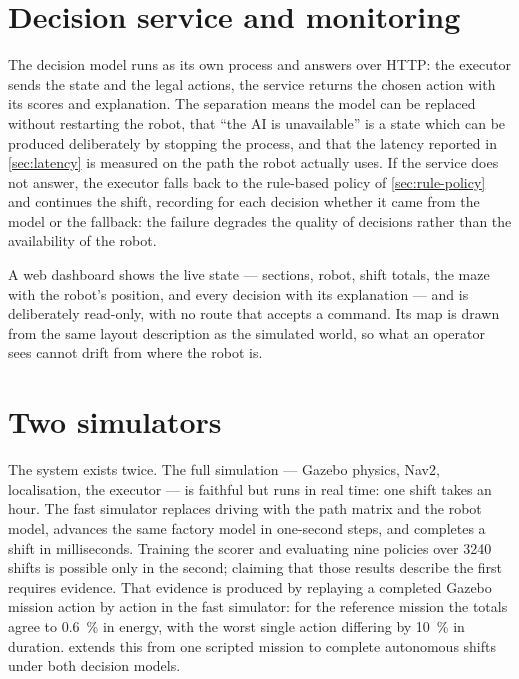 \section{Decision service and monitoring}
\label{sec:service}

The decision model runs as its own process and answers over HTTP: the executor sends the state and
the legal actions, the service returns the chosen action with its scores and explanation. The
separation means the model can be replaced without restarting the robot, that ``the AI is
unavailable'' is a state which can be produced deliberately by stopping the process, and that the
latency reported in \cref{sec:latency} is measured on the path the robot actually uses. If the
service does not answer, the executor falls back to the rule-based policy of
\cref{sec:rule-policy} and continues the shift, recording for each decision whether it came from
the model or the fallback: the failure degrades the quality of decisions rather than the
availability of the robot.

A web dashboard shows the live state --- sections, robot, shift totals, the maze with the robot's
position, and every decision with its explanation --- and is deliberately read-only, with no route
that accepts a command. Its map is drawn from the same layout description as the simulated world,
so what an operator sees cannot drift from where the robot is.

\section{Two simulators}
\label{sec:two-simulators}

The system exists twice. The full simulation --- Gazebo physics, Nav2, localisation, the executor
--- is faithful but runs in real time: one shift takes an hour. The fast simulator replaces driving
with the path matrix and the robot model, advances the same factory model in one-second steps, and
completes a shift in milliseconds. Training the scorer and evaluating nine policies over \num{3240}
shifts is possible only in the second; claiming that those results describe the first requires
evidence. That evidence is produced by replaying a completed Gazebo mission action by action in the
fast simulator: for the reference mission the totals agree to \SI{0.6}{\percent} in energy, with the
worst single action differing by \SI{10}{\percent} in duration.  extends
this from one scripted mission to complete autonomous shifts under both decision models.
